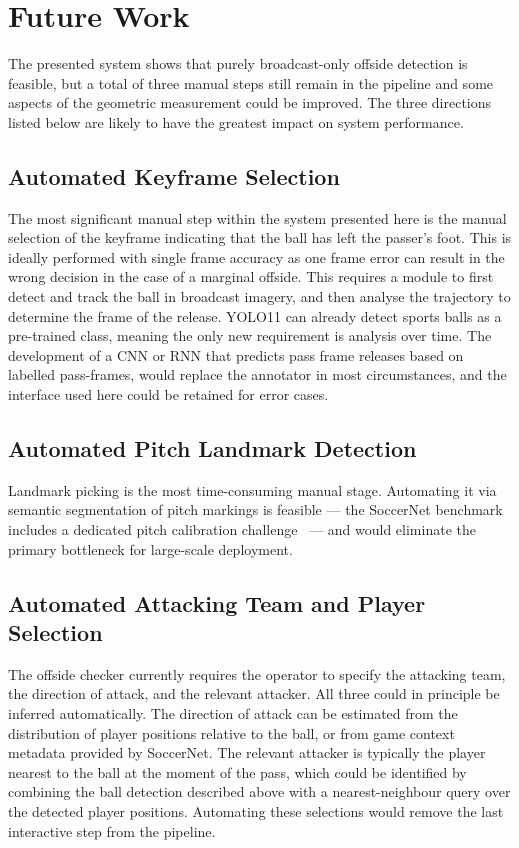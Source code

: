 \chapter{Future Work}%
\label{chp:future_work}

The presented system shows that purely broadcast-only offside detection is feasible, but a total of three manual steps still remain in the pipeline and some aspects of the geometric measurement could be improved. The three directions listed below are likely to have the greatest impact on system performance.

\section{Automated Keyframe Selection}%
\label{sec:fw_keyframe}

The most significant manual step within the system presented here is the manual selection of the keyframe indicating that the ball has left the passer's foot. This is ideally performed with single frame accuracy as one frame error can result in the wrong decision in the case of a marginal offside. This requires a module to first detect and track the ball in broadcast imagery, and then analyse the trajectory to determine the frame of the release. YOLO11 can already detect sports balls as a pre-trained class, meaning the only new requirement is analysis over time. The development of a CNN or RNN that predicts pass frame releases based on labelled pass-frames, would replace the annotator in most circumstances, and the interface used here could be retained for error cases.

\section{Automated Pitch Landmark Detection}%
\label{sec:fw_landmarks}

Landmark picking is the most time-consuming manual stage. Automating it via semantic segmentation of pitch markings is feasible --- the SoccerNet benchmark includes a dedicated pitch calibration challenge~\cite{giancola2018soccernet} --- and would eliminate the primary bottleneck for large-scale deployment.

\section{Automated Attacking Team and Player Selection}%
\label{sec:fw_auto_selection}

The offside checker currently requires the operator to specify the attacking team, the direction of attack, and the relevant attacker. All three could in principle be inferred automatically. The direction of attack can be estimated from the distribution of player positions relative to the ball, or from game context metadata provided by SoccerNet. The relevant attacker is typically the player nearest to the ball at the moment of the pass, which could be identified by combining the ball detection described above with a nearest-neighbour query over the detected player positions. Automating these selections would remove the last interactive step from the pipeline.

